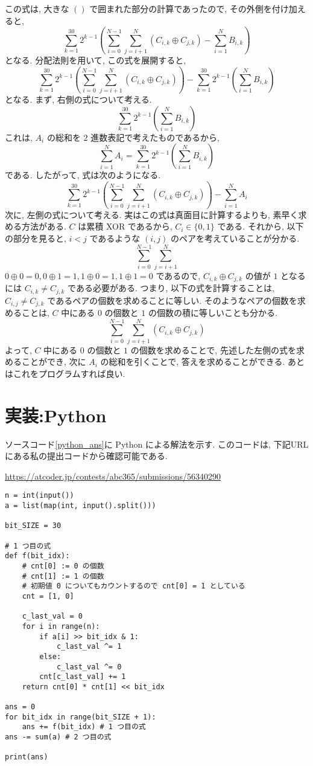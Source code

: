    この式は, 大きな $\left(\right)$ で囲まれた部分の計算であったので, その外側を付け加えると,
    $$\sum_{k = 1}^{30} 2^{k - 1} \left(\sum_{i = 0}^{N - 1}\sum_{j = i + 1}^N (C_{i, k} \oplus C_{j, k}) - \sum_{i = 1}^{N} B_{i, k}\right)$$
    となる.
    分配法則を用いて, この式を展開すると,
    $$\sum_{k = 1}^{30} 2^{k - 1} \left(\sum_{i = 0}^{N - 1}\sum_{j = i + 1}^N (C_{i, k} \oplus C_{j, k})\right) - \sum_{k = 1}^{30} 2^{k - 1} \left(\sum_{i = 1}^{N} B_{i, k}\right)$$
    となる.
    まず, 右側の式について考える.
    $$\sum_{k = 1}^{30} 2^{k - 1} \left(\sum_{i = 1}^{N} B_{i, k}\right)$$
    これは, $A_i$ の総和を $2$ 進数表記で考えたものであるから, 
    $$\sum_{i = 1}^{N} A_i = \sum_{k = 1}^{30} 2^{k - 1} \left(\sum_{i = 1}^{N} B_{i, k}\right)$$
    である.
    したがって, 式は次のようになる.
    $$\sum_{k = 1}^{30} 2^{k - 1} \left(\sum_{i = 0}^{N - 1}\sum_{j = i + 1}^N (C_{i, k} \oplus C_{j, k})\right) - \sum_{i = 1}^{N} A_i$$
    次に, 左側の式について考える.
    実はこの式は真面目に計算するよりも, 素早く求める方法がある.
    $C$ は累積 XOR であるから, $C_i \in \{0, 1\}$ である.
    それから, 以下の部分を見ると, $i < j$ であるような $(i, j)$ のペアを考えていることが分かる.
    $$\sum_{i = 0}^{N - 1}\sum_{j = i + 1}^N$$
    $0 \oplus 0 = 0, 0 \oplus 1 = 1, 1 \oplus 0 = 1, 1 \oplus 1 = 0$ であるので, $C_{i, k} \oplus C_{j, k}$ の値が $1$ となるには $C_{i, k} \neq C_{j, k}$ である必要がある.
    つまり, 以下の式を計算することは, $C_{i, j} \neq C_{j, k}$ であるペアの個数を求めることに等しい.
    そのようなペアの個数を求めることは, $C$ 中にある $0$ の個数と $1$ の個数の積に等しいことも分かる.
    $$\sum_{i = 0}^{N - 1}\sum_{j = i + 1}^N (C_{i, k} \oplus C_{j, k})$$
    よって, $C$ 中にある $0$ の個数と $1$ の個数を求めることで, 先述した左側の式を求めることができ, 次に $A_i$ の総和を引くことで, 答えを求めることができる.
    あとはこれをプログラムすれば良い.

    \section*{実装:Python}
    ソースコード\ref{python_ans}に Python による解法を示す.
    このコードは, 下記URLにある私の提出コードから確認可能である.

    \url{https://atcoder.jp/contests/abc365/submissions/56340290}
\begin{lstlisting}[caption=Pythonのコード, label=python_ans]
n = int(input())
a = list(map(int, input().split()))

bit_SIZE = 30

# 1 つ目の式
def f(bit_idx):
    # cnt[0] := 0 の個数
    # cnt[1] := 1 の個数
    # 初期値 0 についてもカウントするので cnt[0] = 1 としている
    cnt = [1, 0]

    c_last_val = 0
    for i in range(n):
        if a[i] >> bit_idx & 1:
            c_last_val ^= 1
        else:
            c_last_val ^= 0
        cnt[c_last_val] += 1
    return cnt[0] * cnt[1] << bit_idx

ans = 0
for bit_idx in range(bit_SIZE + 1):
    ans += f(bit_idx) # 1 つ目の式
ans -= sum(a) # 2 つ目の式

print(ans)
\end{lstlisting}

